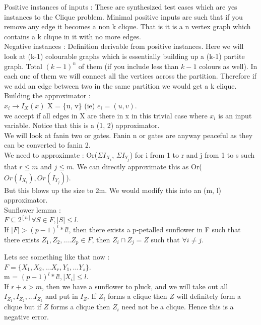 \documentclass[solution,addpoints,12pt]{exam}
\begin{document}
Positive instances of inputs : These
are synthesized test cases which are yes instances to the
Clique problem. Minimal positive inputs are such that
if you remove any edge it becomes a non k clique. That is
it is a n vertex graph which contains a k clique in it
with no more edges.\\

Negative instances : Definition derivable from positive instances.
Here we will look at (k-1) colourable graphs which is
essentially building up a (k-1) partite graph. Total ${(k-1)}^n$ of them (if
you include less than $k-1$ colours as well). In each one of them we will connect all
the vertices across the partition. Therefore if we add an edge between two
in the same partition we would get a k clique.\\

Building the approximator :\\

$x_i \rightarrow I_X(x)$ X = \{u, v\} (ie) $e_i = (u, v)$.\\
we accept if all edges in X are there in x in this trivial case where
$x_i$ is an input variable. Notice that this is a (1, 2) approximator.\\

We will look at fanin two or gates. Fanin n or gates are anyway peaceful
as they can be converted to fanin 2.\\
We need to approximate : Or($ \Sigma I_{X_i}$, $ \Sigma I_{Y_j}$)
for i from 1 to r and j from 1 to s such that $r \le m$ and $j \le m$.
We can directly approximate this as Or($ Or(I_{X_i}), Or(I_{Y_j})$).\\
But this blows up the size to 2m. We would modify this into an (m, l)
approximator.\\

Sunflower lemma :\\
$F \subseteq 2^{[n]} \forall S \in F, |S| \le l$.\\
If $|F| > {(p-1)}^l * l!$, then there exists a p-petalled sunflower in F such that
there exists $Z_1, Z_2, .... Z_p \in F$, then
$Z_i \cap Z_j = Z$ such that $\forall i \ne j$.

Lets see something like that now :\\
$F = \{ X_1, X_2, ... X_r, Y_1, ... Y_s\}$.\\
m = ${(p-1)}^l*l!, |X_i| \le l$.\\
If $r+s > m$, then we have a sunflower to pluck, and
we will take out all $I_{Z_1}, I_{Z_2}, ... I_{Z_k}$ and put in $I_Z$.
If $Z_i$ forms a clique then $Z$ will definitely form a clique but if $Z$ forms
a clique then $Z_i$ need not be a clique. Hence this is a negative error.\\
\end{document}
